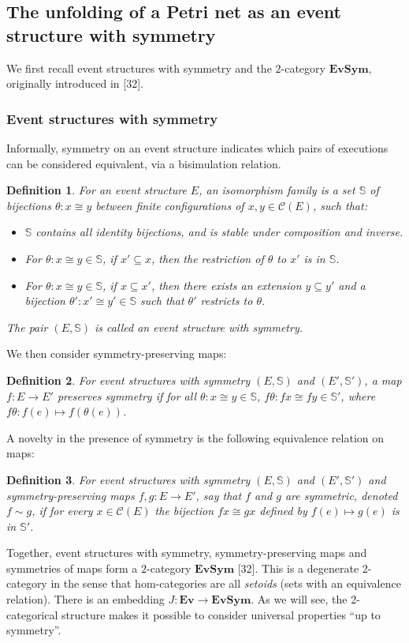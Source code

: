 \documentclass[10pt,a4paper]{amsart}
\newtheorem*{definition}{Definition}
\newcommand{\ES}{\mathbf{Ev}}
\newcommand{\SES}{\mathbf{EvSym}}
\newcommand{\conf}{\mathscr C}
\begin{document}
\subsection{The unfolding of a Petri net as an event structure with symmetry}

We first recall event structures with symmetry and the $2$-category $\SES$, originally introduced in [32].

\subsubsection{Event structures with symmetry}

\label{subsec:sem-def}
 Informally, symmetry on an event structure indicates which pairs of executions can be considered equivalent, via a bisimulation relation. 
\begin{definition}
    For an event structure $E$, an isomorphism family  is a set $\mathbb{S}$ of bijections $\theta:x \cong y$ between finite configurations of $x, y \in \conf(E)$, such that:
    \begin{itemize}
        \item $\mathbb{S}$ contains all identity bijections, and is stable under composition and inverse.  
        \item For $\theta : x \cong y \in \mathbb{S}$, if $x' \subseteq x$, then the restriction of $\theta$ to $x'$ is in $\mathbb{S}$.
        \item For $\theta : x \cong y \in \mathbb{S}$, if $x \subseteq x'$, then there exists an extension $y \subseteq y'$ and a bijection $\theta' : x' \cong y' \in \mathbb{S}$ such that $\theta'$ restricts to $\theta$.
    \end{itemize}
    The pair $(E, \mathbb{S})$ is called an \emph{event structure with symmetry}.
\end{definition}

We then consider symmetry-preserving maps:
\begin{definition}
    For event structures with symmetry $(E,\mathbb{S})$ and $(E', \mathbb{S}')$, a map $f : E \rightarrow E'$ \emph{preserves symmetry} if for all $\theta : x \cong y \in \mathbb{S}$, $f \theta : fx \cong fy \in \mathbb{S}'$, where $f\theta : f(e) \mapsto f(\theta(e))$.
\end{definition}
A novelty in the presence of symmetry is the following equivalence relation on maps:
\begin{definition}
    For event structures with symmetry $(E,\mathbb{S})$ and $(E', \mathbb{S}')$ and symmetry-preserving maps $f, g : E \rightarrow E'$, say that $f$ and $g$ are \emph{symmetric}, denoted $f \sim g$, if for every $x \in \conf(E)$ the bijection $fx \cong gx$ defined by $ f(e) \mapsto g(e)$ is in $\mathbb{S}'$.
\end{definition}
Together, event structures with symmetry, symmetry-preserving maps and symmetries of maps form a $2$-category $\SES$ [32]. This is a degenerate 2-category in the sense that hom-categories are all \emph{setoids} (sets with an equivalence relation). There is an embedding $J : \ES \to \SES$. As we will see, the 2-categorical structure makes it possible to consider universal properties ``up to symmetry''.
\end{document}
